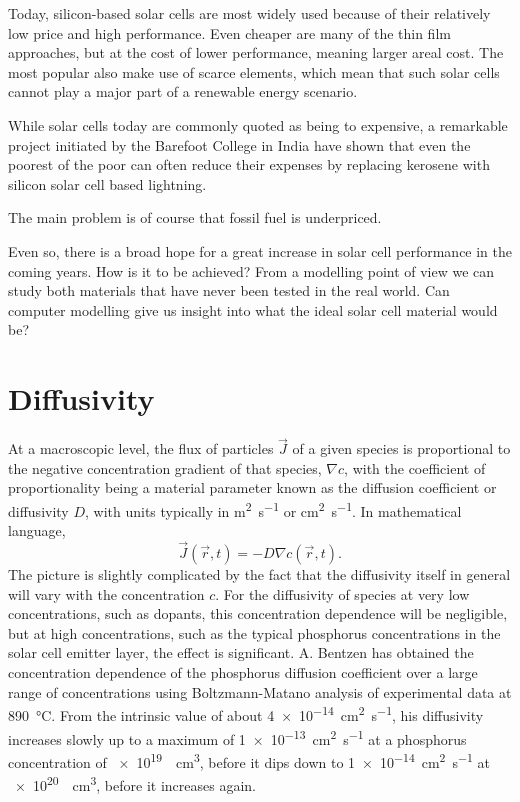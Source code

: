 \documentclass[11pt,bibliography=totoc,index=totoc]{scrbook}   %
\begin{document}
Today, silicon-based solar cells are most widely used because of their
relatively low price and high performance. Even cheaper are many of the thin
film approaches, but at the cost of lower performance, meaning larger areal
cost. The most popular also make use of scarce elements, which mean that such
solar cells cannot play a major part of a renewable energy scenario.

While solar cells today are commonly quoted as being to expensive, a remarkable
project initiated by the Barefoot College in India have shown that even the
poorest of the poor can often reduce their expenses by replacing kerosene with
silicon solar cell based lightning.

The main problem is of course that fossil fuel is underpriced.

Even so, there is a broad hope for a great increase in solar cell performance in
the coming years. How is it to be achieved? From a modelling point of view we
can study both materials that have never been tested in the real world. Can
computer modelling give us insight into what the ideal solar cell material would
be?


\section{Diffusivity}

At a macroscopic level, the flux of particles $\vec{J}$ of a given species is proportional to the negative concentration gradient of that species, $\nabla c$, with the coefficient of proportionality being a material parameter known as the diffusion coefficient or diffusivity $D$, with units typically in \si{\metre\squared\per\second} or \si{\centi\metre\squared\per\second}.
In mathematical language,
\begin{equation}
  \vec{J}(\vec{r},t) = - D \nabla c(\vec{r},t).
\end{equation}
The picture is slightly complicated by the fact that the diffusivity itself in general will vary with the concentration $c$.
For the diffusivity of species at very low concentrations, such as dopants, this concentration dependence will be negligible, but at high concentrations, such as the typical phosphorus concentrations in the solar cell emitter layer, the effect is significant.
A. Bentzen has obtained the concentration dependence of the phosphorus diffusion coefficient over a large range of concentrations using Boltzmann-Matano analysis of experimental data at \SI{890}{\celsius}. 
From the intrinsic value of about \SI{4e-14}{\centi\metre\squared\per\second}, his diffusivity increases slowly up to a maximum of \SI{1e-13}{\centi\metre\squared\per\second} at a phosphorus concentration of \SI{e19}{\per\centi\metre\cubed}, before it dips down to \SI{1e-14}{\centi\metre\squared\per\second} at \SI{e20}{\per\centi\metre\cubed}, before it increases again.\cite{Bentzen:2006}
\end{document}

